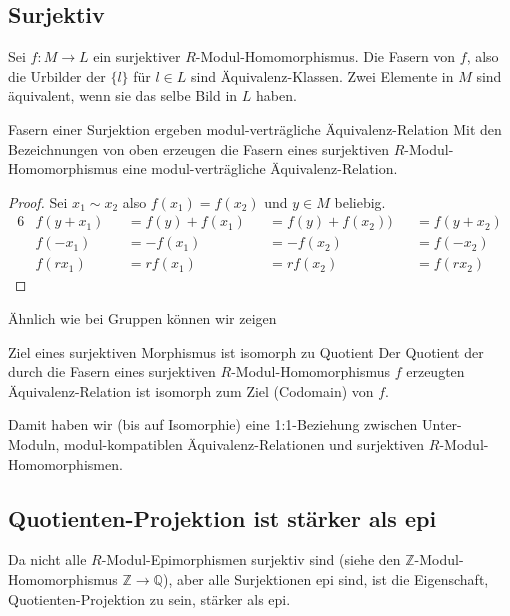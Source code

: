 \documentclass[a4paper]{amsart}
\theoremstyle{definition}
\newcommand{\Q}{\ensuremath{\mathbb{ Q }}}
\newcommand{\Z}{\ensuremath{\mathbb{ Z }}}
\begin{document}
\subsection{Surjektiv}
Sei $f \colon M \to L$ ein surjektiver $R$-Modul-Homomorphismus. Die Fasern von $f$, also die Urbilder  der $\{l\}$ für $l \in L$ sind Äquivalenz-Klassen. Zwei Elemente in $M$ sind äquivalent, wenn sie das selbe Bild in $L$ haben.
\begin{Satz}{Fasern einer Surjektion ergeben modul-verträgliche Äquivalenz-Relation}
   Mit den Bezeichnungen von oben erzeugen die Fasern eines surjektiven $R$-Modul-Homomorphismus eine modul-verträgliche Äquivalenz-Relation.
\end{Satz}
\begin{proof}
   Sei $x_1 \sim x_2$ also $f(x_1) = f(x_2)$ und $y \in M$ beliebig.
   \begin{alignat}{6}
      &f(y + x_1) &&= f(y) + f(x_1) &&= f(y) + f(x_2) ) &&= f(y + x_2)\\
      &f(-x_1)    &&= -f(x_1)       &&= -f(x_2)         &&= f(-x_2)\\
      &f(rx_1)    &&= rf(x_1)       &&= rf(x_2)         &&= f(rx_2)
   \end{alignat}
\end{proof}

Ähnlich wie bei Gruppen können wir zeigen
\begin{Satz}{Ziel eines surjektiven Morphismus ist isomorph zu Quotient}
   Der Quotient der durch die Fasern eines surjektiven $R$-Modul-Homomorphismus $f$ erzeugten Äquivalenz-Relation ist isomorph zum Ziel (Codomain) von $f$.
\end{Satz}

{\color{red}Damit haben wir (bis auf Isomorphie) eine 1:1-Beziehung zwischen Unter-Moduln, modul-kompatiblen Äquivalenz-Relationen und surjektiven $R$-Modul-Homomorphismen.}

\subsection{Quotienten-Projektion ist stärker als epi}
Da nicht alle $R$-Modul-Epimorphismen surjektiv sind (siehe den $\Z$-Modul-Homomorphismus $\Z \to \Q$), aber alle Surjektionen epi sind, ist die Eigenschaft, Quotienten-Projektion zu sein, stärker als epi.
\end{document}
